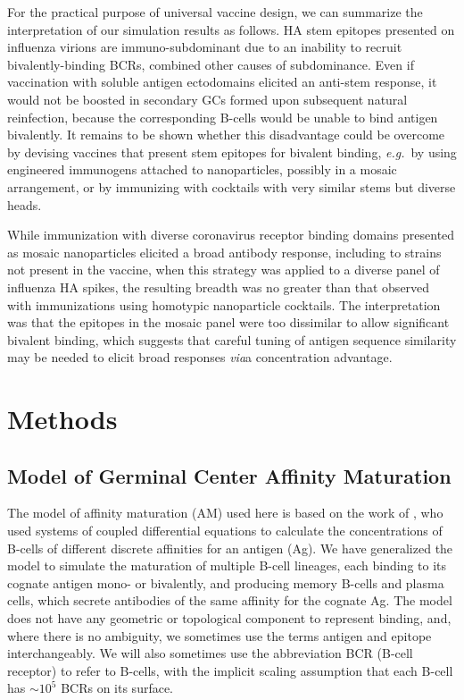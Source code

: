 \documentclass[utf8]{frontiersHLTH}%
\newcommand{\cred}[1]{\textsf{\color{red}#1}}
\def\eg {{\it e.g.}}
\def\via {{\it via}}
\begin{document}
\cred{For the practical purpose of universal vaccine
design, we can summarize the interpretation of our simulation results as
follows.  HA stem epitopes presented on influenza virions are
immuno-subdominant due to an inability to recruit bivalently-binding
BCRs, combined other causes of subdominance. Even if vaccination with
soluble antigen ectodomains elicited an anti-stem response, it would not
be boosted in secondary GCs formed upon subsequent natural reinfection, 
because the corresponding B-cells would be unable to bind antigen
bivalently. It remains to be shown whether this disadvantage could be
overcome by devising vaccines that present stem epitopes for bivalent
binding, \eg~by using engineered immunogens attached to
nanoparticles,\cite{corbett19} possibly in a mosaic
arrangement\cite{cohen21}, or by immunizing with cocktails with very
similar stems but diverse heads\cite{glanville20}.}

\cred{While
immunization with diverse coronavirus receptor binding domains presented
as mosaic nanoparticles elicited a broad antibody response, including to
strains not present in the vaccine,\cite{cohen21} when this strategy was
applied to a diverse panel of influenza HA spikes, the resulting breadth
was no greater than that observed with immunizations using homotypic
nanoparticle cocktails.\cite{cohen21a} The interpretation was that the
epitopes in the mosaic panel were too dissimilar to allow significant
bivalent binding, which suggests that careful tuning of antigen sequence
similarity may be needed to elicit broad responses \via a concentration
advantage.}

\section{Methods}
\label{sec:methods}

\subsection*{Model of Germinal Center Affinity Maturation}

The model of affinity maturation (AM) used here is based on the work of
\citet{kepler93},
who used systems of coupled
differential equations to calculate the concentrations of B-cells of
different discrete affinities for an antigen (Ag). %
We have generalized the model to
simulate the maturation of multiple B-cell lineages, each binding to its cognate
antigen mono- or bivalently, and producing memory B-cells and plasma
cells, which secrete antibodies of the same affinity for the cognate Ag. The model does not have any
geometric or topological component to represent binding, and, where there is no ambiguity, we sometimes use
the terms antigen and epitope interchangeably. We will also sometimes use
the abbreviation BCR (B-cell receptor) to refer to B-cells, with the implicit
scaling assumption that each B-cell has $\sim10^5$ BCRs on its surface.\cite{casten88,Alberts02}
\end{document}

